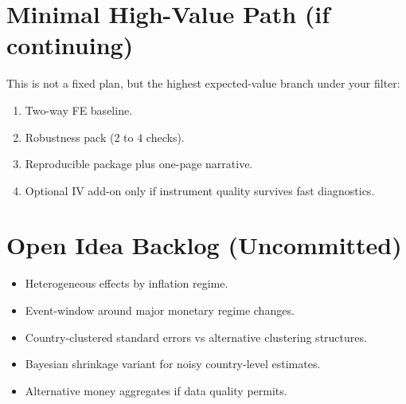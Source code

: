 \documentclass[11pt]{article}
\begin{document}
\section{Minimal High-Value Path (if continuing)}
This is not a fixed plan, but the highest expected-value branch under your filter:
\begin{enumerate}
\item Two-way FE baseline.
\item Robustness pack (2 to 4 checks).
\item Reproducible package plus one-page narrative.
\item Optional IV add-on only if instrument quality survives fast diagnostics.
\end{enumerate}

\section{Open Idea Backlog (Uncommitted)}
\begin{itemize}
\item Heterogeneous effects by inflation regime.
\item Event-window around major monetary regime changes.
\item Country-clustered standard errors vs alternative clustering structures.
\item Bayesian shrinkage variant for noisy country-level estimates.
\item Alternative money aggregates if data quality permits.
\end{itemize}
\end{document}
